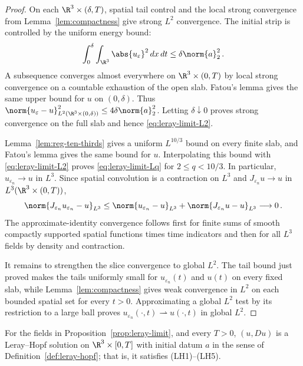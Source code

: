 \documentclass[11pt,reqno]{amsart}
\begin{document}
\begin{proof}
On each $\R^3\times(\delta,T)$, spatial tail control and the local strong
convergence from Lemma~\ref{lem:compactness} give strong $L^2$ convergence.
The initial strip is controlled by the uniform energy bound:
\begin{equation*}
 \int_0^\delta\int_{\R^3}\abs{u_\varepsilon}^2\,dx\,dt
 \le \delta\norm{a}_2^2\,.
\end{equation*}
A subsequence converges almost everywhere on $\R^3\times(0,T)$ by local
strong convergence on a countable exhaustion of the open slab. Fatou's
lemma gives the same upper bound for $u$ on $(0,\delta)$. Thus
$\norm{u_\varepsilon-u}_{L^2(\R^3\times(0,\delta))}^2
\le4\delta\norm{a}_2^2$. Letting $\delta\downarrow0$ proves strong
convergence on the full slab and hence \eqref{eq:leray-limit-L2}.

Lemma~\ref{lem:reg-ten-thirds} gives a uniform $L^{10/3}$ bound on every
finite slab, and Fatou's lemma gives the same bound for $u$. Interpolating
this bound with \eqref{eq:leray-limit-L2} proves
\eqref{eq:leray-limit-Lq} for $2\le q<10/3$. In particular,
$u_{\varepsilon_n}\to u$ in $L^3$. Since spatial convolution is a
contraction on $L^3$ and $J_{\varepsilon_n}u\to u$ in
$L^3(\R^3\times(0,T))$,
\begin{equation*}
\norm{J_{\varepsilon_n}u_{\varepsilon_n}-u}_{L^3}
\le \norm{u_{\varepsilon_n}-u}_{L^3}
 +\norm{J_{\varepsilon_n}u-u}_{L^3}\longrightarrow0\,.
\end{equation*}
The approximate-identity convergence follows first for finite sums of
smooth compactly supported spatial functions times time indicators and then
for all $L^3$ fields by density and contraction.

It remains to strengthen the slice convergence to global $L^2$. The tail
bound just proved makes the tails uniformly small for $u_{\varepsilon_n}(t)$
and $u(t)$ on every fixed slab, while Lemma~\ref{lem:compactness} gives
weak convergence in $L^2$ on each bounded spatial set for every $t>0$.
Approximating a global $L^2$ test by its restriction to a large ball proves
$u_{\varepsilon_n}(\cdot,t)\rightharpoonup u(\cdot,t)$ in global $L^2$.
\end{proof}

\begin{proposition}\label{prop:leray-hopf-limit}
For the fields in Proposition~\ref{prop:leray-limit}, and every $T>0$,
$(u,Du)$ is a Leray--Hopf solution on $\R^3\times[0,T]$ with initial datum
$a$ in the sense of Definition~\ref{def:leray-hopf}; that is, it satisfies
(LH1)--(LH5).
\end{proposition}
\end{document}
